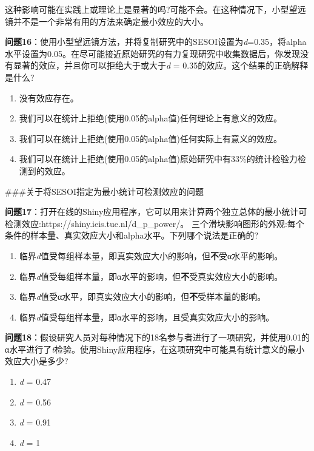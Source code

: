 \documentclass[
  letterpaper,
  DIV=11,
  numbers=noendperiod]{scrreprt}
\providecommand{\tightlist}{%
  \setlength{\itemsep}{0pt}\setlength{\parskip}{0pt}}\usepackage{longtable,booktabs,array}
\begin{document}
这种影响可能在实践上或理论上是显著的吗?可能不会。在这种情况下，小型望远镜并不是一个非常有用的方法来确定最小效应的大小。

\textbf{问题16}：使用小型望远镜方法，并将复制研究中的SESOI设置为\emph{d}=0.35，将alpha水平设置为0.05。在尽可能接近原始研究的有力复现研究中收集数据后，你发现没有显著的效应，并且你可以拒绝大于或大于\emph{d}
= 0.35的效应。这个结果的正确解释是什么?

\begin{enumerate}
\def\labelenumi{\Alph{enumi})}
\tightlist
\item
  没有效应存在。
\item
  我们可以在统计上拒绝(使用0.05的alpha值)任何理论上有意义的效应。
\item
  我们可以在统计上拒绝(使用0.05的alpha值)任何实际上有意义的效应。
\item
  我们可以在统计上拒绝(使用0.05的alpha值)原始研究中有33\%的统计检验力检测到的效应。
\end{enumerate}

\#\#\#关于将SESOI指定为最小统计可检测效应的问题

\textbf{问题17}：打开在线的Shiny应用程序，它可以用来计算两个独立总体的最小统计可检测效应:https://shiny.ieis.tue.nl/d\_p\_power/。
三个滑块影响图形的外观:每个条件的样本量、真实效应大小和alpha水平。下列哪个说法是正确的?

\begin{enumerate}
\def\labelenumi{\Alph{enumi})}
\tightlist
\item
  临界\emph{d}值受每组样本量，即真实效应大小的影响，但\textbf{不}受α水平的影响。
\item
  临界\emph{d}值受每组样本量，即α水平的影响，但\textbf{不}受真实效应大小的影响。
\item
  临界\emph{d}值受α水平，即真实效应大小的影响，但\textbf{不}受样本量的影响。
\item
  临界\emph{d}值受每组样本量，即α水平的影响，且受真实效应大小的影响。
\end{enumerate}

\textbf{问题18}：假设研究人员对每种情况下的18名参与者进行了一项研究，并使用0.01的α水平进行了\emph{t}检验。使用Shiny应用程序，在这项研究中可能具有统计意义的最小效应大小是多少?

\begin{enumerate}
\def\labelenumi{\Alph{enumi})}
\tightlist
\item
  \emph{d} = 0.47
\item
  \emph{d} = 0.56
\item
  \emph{d} = 0.91
\item
  \emph{d} = 1
\end{enumerate}
\end{document}
